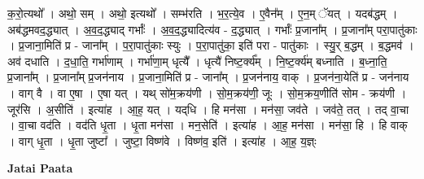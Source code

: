 \documentclass[17pt]{extarticle}
\begin{document}
क॒रो॒त्यथो᳚ । अथो॒ सम् । अथो॒ इत्यथो᳚ । सम्भ॑रति । भ॒र॒त्ये॒व । ए॒वैन᳚म् । ए॒न॒म् ॅयत् । यदब॑द्धम् । अब॑द्धमवद॒द्ध्यात् । अ॒व॒द॒द्ध्याद् गर्भाः᳚ । अ॒व॒द॒द्ध्यादित्य॑व - द॒द्ध्यात् । गर्भाः᳚ प्र॒जाना᳚म् । प्र॒जाना᳚म् परा॒पातु॑काः । प्र॒जाना॒मिति॑ प्र - जाना᳚म् । प॒रा॒पातु॑काः स्युः । प॒रा॒पातु॑का॒ इति॑ परा - पातु॑काः । स्यु॒र् ब॒द्धम् । ब॒द्धमव॑ । अव॑ दधाति । द॒धा॒ति॒ गर्भा॑णाम् । गर्भा॑णा॒म् धृत्यै᳚ । धृत्यै॑ निष्ट॒र्क्य᳚म् । नि॒ष्ट॒र्क्य॑म् बध्नाति । ब॒ध्ना॒ति॒ प्र॒जाना᳚म् । प्र॒जाना᳚म् प्र॒जन॑नाय । प्र॒जाना॒मिति॑ प्र - जाना᳚म् । प्र॒जन॑नाय॒ वाक् । प्र॒जन॑ना॒येति॑ प्र - जन॑नाय । वाग् वै । वा ए॒षा । ए॒षा यत् । यथ् सो॑म॒क्रय॑णी । सो॒म॒क्रय॑णी॒ जूः । सो॒म॒क्रय॒णीति॑ सोम - क्रय॑णी । जूर॑सि । अ॒सीति॑ । इत्या॑ह । आ॒ह॒ यत् । यद्‌धि । हि मन॑सा । मन॑सा॒ जव॑ते । जव॑ते॒ तत् । तद् वा॒चा । वा॒चा वद॑ति । वद॑ति धृ॒ता । धृ॒ता मन॑सा । मन॒सेति॑ । इत्या॑ह । आ॒ह॒ मन॑सा । मन॑सा॒ हि । हि वाक् । वाग् धृ॒ता । धृ॒ता जुष्टा᳚ । जुष्टा॒ विष्ण॑वे । विष्ण॑व॒ इति॑ । इत्या॑ह । आ॒ह॒ य॒ज्ञ्ः \newline

\textbf{Jatai Paata} \newline
\end{document}
